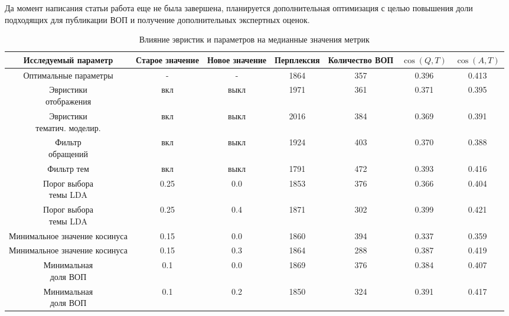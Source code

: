 Да момент написания статьи работа еще не была завершена, планируется дополнительная оптимизация с целью повышения доли подходящих для публикации ВОП и получение дополнительных экспертных оценок.
\begin{landscape}
\begin{table*}[t]
  \caption{Влияние эвристик и параметров на медианные значения метрик}
  \label{quality}
  \centering
  \begin{tabular}{|c|c|c||c|c|c|c|}
     \hline
      \parbox[t]{3cm}{\textbf{Исследуемый параметр}} &%
     \parbox[t]{2cm}{\textbf{Старое значение}} &%
     \parbox[t]{1.7cm}{\textbf{Новое значение}} &%
     \textbf{Перплексия} &%
     \parbox[t]{2cm}{\textbf{Количество ВОП}} &%
     \textbf{$\cos(Q,T)$} &%
     \textbf{$\cos(A,T)$} \\
	 \hline
     \parbox[t]{3cm}{Оптимальные параметры} &%
     - &%
     - &%
	 1864 &%
     357 &%
 	 0.396 &%
     0.413 \\
  	 \hline
     \parbox[t]{3cm}{Эвристики \\отображения} &%
     вкл &%
     выкл &%
	 1971 &%
     361 &%
 	 0.371 &%
     0.395 \\
	 \hline
	 \parbox[t]{3cm}{Эвристики \\тематич. моделир.} &%
     вкл &%
     выкл &%
	 2016 &%
     384 &%
 	 0.369 &%
     0.391 \\
	 \hline
\parbox[t]{3cm}{Фильтр \\обращений} &%
     вкл &%
     выкл &%
	 1924 &%
     403 &%
 	 0.370 &%
     0.388 \\
	 \hline
\parbox[t]{3cm}{Фильтр тем} &%
     вкл &%
     выкл &%
	 1791 &%
     472 &%
 	 0.393 &%
     0.416 \\
     \hline
\parbox[t]{3cm}{Порог выбора \\темы LDA} &%
     0.25 &%
     0.0 &%
	 1853 &%
     376 &%
 	 0.366 &%
     0.404 \\
     \hline
\parbox[t]{3cm}{Порог выбора \\темы LDA} &%
     0.25 &%
     0.4 &%
	 1871 &%
     302 &%
 	 0.399 &%
     0.421 \\
     \hline
\parbox[t]{3cm}{Минимальное значение косинуса} &%
     0.15 &%
     0.0 &%
	 1860 &%
     394 &%
 	 0.337 &%
     0.359 \\
     \hline
\parbox[t]{3cm}{Минимальное значение косинуса} &%
     0.15 &%
     0.3 &%
	 1864 &%
     288 &%
 	 0.387 &%
     0.419 \\
     \hline         
\parbox[t]{3cm}{Минимальная \\доля ВОП} &%
     0.1 &%
     0.0 &%
	 1869 &%
     376 &%
 	 0.384 &%
     0.407 \\
     \hline
\parbox[t]{3cm}{Минимальная \\доля ВОП} &%
     0.1 &%
     0.2 &%
	 1850 &%
     324 &%
 	 0.391 &%
     0.417 \\
     \hline     
  \end{tabular}

\end{table*}
\end{landscape}

